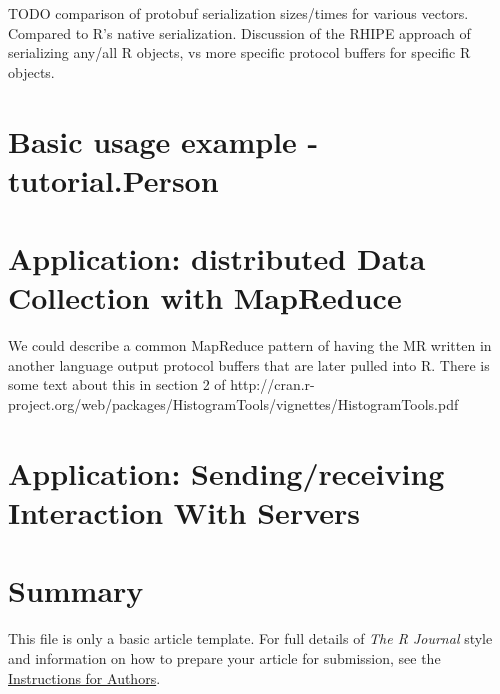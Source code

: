 TODO comparison of protobuf serialization sizes/times for various vectors.  Compared to R's native serialization.  Discussion of the RHIPE approach of serializing any/all R objects, vs more specific protocol buffers for specific R objects.

\section{Basic usage example - tutorial.Person}

\section{Application: distributed Data Collection with MapReduce}

We could describe a common MapReduce pattern of having the MR written
in another language output protocol buffers that are later pulled into
R.  There is some text about this in section 2 of
http://cran.r-project.org/web/packages/HistogramTools/vignettes/HistogramTools.pdf 

\section{Application: Sending/receiving Interaction With Servers}

\section{Summary}

This file is only a basic article template. For full details of \emph{The R Journal} style and information on how to prepare your article for submission, see the \href{http://journal.r-project.org/latex/RJauthorguide.pdf}{Instructions for Authors}.



\address{Dirk Eddelbuettel\\
  Debian and R Projects\\
  711 Monroe Avenue, River Forest, IL 60305\\
  USA}

\address{Author Two\\
  Affiliation\\
  Address\\
  Country}

\address{Murray Stokely\\
  Google, Inc.\\
  1600 Amphitheatre Parkway\\
  Mountain View, CA 94043\\
  USA}
